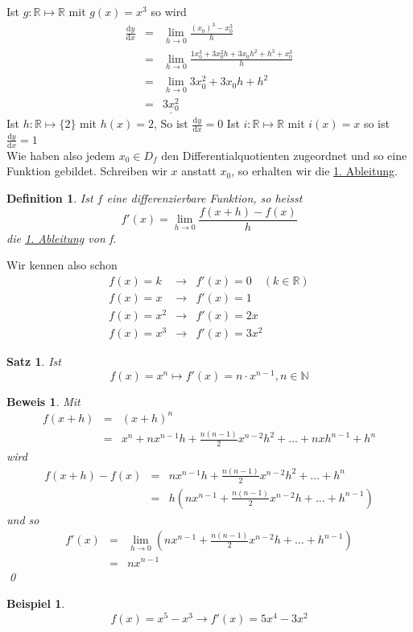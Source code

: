 \documentclass{report}
\newtheorem{mydef}{Definition}
\newtheorem{myexample}{Beispiel}
\newtheorem{myproof}{Beweis}
\newtheorem{satz}{Satz}
\begin{document}
Ist $ g:\mathbb{R} \mapsto \mathbb{R}$ mit $ g(x) = x^3$ so wird \begin{eqnarray}
\frac{\mathrm{d}y}{\mathrm{d}x} & = & \lim_{h \to 0} \frac{(x_0)^3 - x_0^3}{h} \nonumber \\
& = & \lim_{h \to 0} \frac{1x_0^3 + 3x_0^2h + 3 x_0h^2 + h^3 + x_0^3}{h} \nonumber \\
& = & \lim_{h \to 0} 3x_0^2 + 3x_0h + h^2  \nonumber \\
& = & \underline{3x_0^2} \end{eqnarray}
Ist $ h:\mathbb{R} \mapsto \{2\}$ mit $ h(x) = 2$, %
So ist $ \frac{\mathrm{d}y}{\mathrm{d}x} = 0$
Ist $ i:\mathbb{R} \mapsto \mathbb{R}$ mit $ i(x) = x$ %
so ist $\frac{\mathrm{d}y}{\mathrm{d}x} = 1$\\
Wie haben also jedem $x_0 \in D_f$ den Differentialquotienten zugeordnet und so eine Funktion gebildet. Schreiben wir $x$ anstatt $x_0$, so erhalten wir die \underline{1. Ableitung}.
\begin{mydef} Ist $f$ eine differenzierbare Funktion, so heisst \begin{equation*}f'(x) = \lim_{h \to 0} \frac{f(x+h) -f(x)}{h}\end{equation*}
die \underline{1. Ableitung} von f.\end{mydef}
Wir kennen also schon
\begin{eqnarray}
f(x) = k & \to & f'(x) = 0 \quad  (k \in \mathbb{R}) \\
f(x) = x & \to & f'(x) = 1 \\
f(x) = x^2 & \to & f'(x) = 2x \\
f(x) = x^3 & \to & f'(x) = 3x^2 \end{eqnarray}
\begin{satz}
Ist
\begin{equation*}f(x) = x^n \mapsto f'(x) = n \cdot x^{n-1}, n \in \mathbb{N}\end{equation*}\end{satz}
\begin{myproof}Mit \begin{eqnarray}f(x+h) & = & (x+h)^n \nonumber \\
& = & x^n + nx^{n-1}h + \frac{n(n-1)}{2}x^{n-2}h^2+ ... + nxh^{n-1} + h^n\end{eqnarray}
wird
\begin{eqnarray}f(x+h)-f(x) & = & nx^{n-1}h + \frac{n(n-1)}{2}x^{n-2}h^2+ ... + h^n \nonumber \\
& = & h(nx^{n-1}+\frac{n(n-1)}{2}x^{n-2}h + ... + h^{n-1})\end{eqnarray}
und so
\begin{eqnarray}f'(x) & = & \lim_{h \to 0}(nx^{n-1} + \frac{n(n-1)}{2}x^{n-2}h + ... + h^{n-1}) \nonumber \\
& = & nx^{n-1}\end{eqnarray} \qed
\end{myproof}
\begin{myexample}
\begin{equation*}f(x) = x^5-x^3 \to f'(x) = 5x^4-3x^2\end{equation*}
\end{myexample}
\newpage
\end{document}
